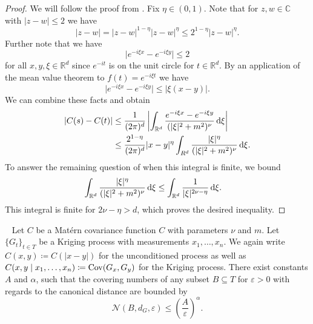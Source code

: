 \begin{proof}
We will follow the proof from \cite[Lemma 4.4]{ernst2020integrability}.
Fix $\eta \in (0,1)$.
Note that for $z,w \in \mathbb{C}$ with $\lvert z-w \rvert \leq 2$ we have
\[
    \lvert z-w \rvert = \lvert z-w \rvert^{1-\eta} \lvert z-w \rvert^{\eta} \leq 2^{1- \eta} \lvert z-w \rvert^{\eta}.
\]
Further note that we have
\[
     \lvert e^{- i \xi x}- e^{-i \xi y} \rvert \leq 2
\]
for all $x,y, \xi \in \mathbb{R}^{d}$ since $e^{-it}$ is on the unit circle for $t \in \mathbb{R}^{d}$.
By an application of the mean value theorem to $f(t)= e^{-i \xi t}$ we have
\[
    \lvert e^{- i \xi x} - e^{- i \xi y} \rvert \leq \lvert \xi (x-y) \rvert.
\]
We can combine these facts and obtain
\begin{align*}
    \lvert C(s)-C(t) \rvert &\leq \frac{1}{(2 \pi)^{d}} \left| \int_{\mathbb{R}^{d}} \frac{e^{-i \xi x} - e^{- i \xi y }}{(\lvert \xi \rvert^2 + m^2)^{\nu}}  \dx[\xi]\right|\\
    &\leq \frac{2^{1-\eta}}{(2\pi)^{d}} \lvert x-y \rvert^{\eta} \int_{R^{d}} \frac{\lvert \xi \rvert^{\eta}}{(\lvert \xi \rvert^2 + m^2)^{\nu}} \dx[\xi].
\end{align*}
To answer the remaining question of when this integral is finite, we bound
\begin{align*}
    \int_{\mathbb{R}^{d}} \frac{\lvert \xi \rvert^{\eta}}{(\lvert \xi \rvert^{2}+m^2)^{\nu}} \dx[\xi] &\leq 
    \int_{\mathbb{R}^{d}} \frac{1}{\lvert \xi \rvert^{2\nu-\eta}} \dx[\xi].
\end{align*}
This integral is finite for $2\nu-\eta > d$, which proves the desired inequality.
\end{proof}
%
%
%
\begin{proposition}
    ~\label{prop:covering_numbers}
    Let $C$ be a Matérn covariance function $C$ with parameters $\nu $ and $m$. Let $\{ G_{t} \}_{t \in T}$ be a Kriging process with measurements $x_{1}, \dots, x_{n}$. We again write $C(x,y) \coloneqq C(\lvert x-y \rvert)$ for the unconditioned process as well as $C(x,y \mid x_{1}, \dots, x_{n}) \coloneqq \Cov(G_{x},G_{y})$ for the Kriging process.
    There exist constants $A$ and $\alpha$, such that the covering numbers of any subset $B \subseteq T$ for $\varepsilon>0$ with regards to the canonical distance are bounded by
    \[
        \mathcal{N}(B,d_{G},\varepsilon) \leq (\frac{A}{\varepsilon})^{\alpha}.
    \] 
\end{proposition}
%
%
